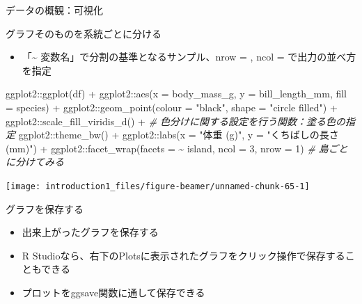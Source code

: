 \documentclass[
  ignorenonframetext,
]{beamer}
\newenvironment{Shaded}{\begin{snugshade}}{\end{snugshade}}
\newcommand{\AttributeTok}[1]{\textcolor[rgb]{0.77,0.63,0.00}{#1}}
\newcommand{\CommentTok}[1]{\textcolor[rgb]{0.56,0.35,0.01}{\textit{#1}}}
\newcommand{\DecValTok}[1]{\textcolor[rgb]{0.00,0.00,0.81}{#1}}
\newcommand{\FunctionTok}[1]{\textcolor[rgb]{0.00,0.00,0.00}{#1}}
\newcommand{\NormalTok}[1]{#1}
\newcommand{\SpecialCharTok}[1]{\textcolor[rgb]{0.00,0.00,0.00}{#1}}
\newcommand{\StringTok}[1]{\textcolor[rgb]{0.31,0.60,0.02}{#1}}
\providecommand{\tightlist}{%
  \setlength{\itemsep}{0pt}\setlength{\parskip}{0pt}}
\begin{document}
\begin{frame}[fragile]{データの概観：可視化}
\begin{block}{グラフそのものを系統ごとに分ける}
\begin{itemize}
  \begin{itemize}
  \tightlist
  \item
    「\textasciitilde{} 変数名」で分割の基準となるサンプル、nrow = ,
    ncol = で出力の並べ方を指定
  \end{itemize}
\end{itemize}

\begin{Shaded}
\begin{Highlighting}[]
\NormalTok{ggplot2}\SpecialCharTok{::}\FunctionTok{ggplot}\NormalTok{(df) }\SpecialCharTok{+}
\NormalTok{  ggplot2}\SpecialCharTok{::}\FunctionTok{aes}\NormalTok{(}\AttributeTok{x =}\NormalTok{ body\_mass\_g, }\AttributeTok{y =}\NormalTok{ bill\_length\_mm, }\AttributeTok{fill =}\NormalTok{ species) }\SpecialCharTok{+}
\NormalTok{  ggplot2}\SpecialCharTok{::}\FunctionTok{geom\_point}\NormalTok{(}\AttributeTok{colour =} \StringTok{"black"}\NormalTok{, }\AttributeTok{shape =} \StringTok{"circle filled"}\NormalTok{) }\SpecialCharTok{+}
\NormalTok{  ggplot2}\SpecialCharTok{::}\FunctionTok{scale\_fill\_viridis\_d}\NormalTok{() }\SpecialCharTok{+} \CommentTok{\# 色分けに関する設定を行う関数：塗る色の指定}
\NormalTok{  ggplot2}\SpecialCharTok{::}\FunctionTok{theme\_bw}\NormalTok{() }\SpecialCharTok{+}
\NormalTok{  ggplot2}\SpecialCharTok{::}\FunctionTok{labs}\NormalTok{(}\AttributeTok{x =} \StringTok{"体重 (g)"}\NormalTok{, }\AttributeTok{y =} \StringTok{"くちばしの長さ (mm)"}\NormalTok{) }\SpecialCharTok{+}
\NormalTok{  ggplot2}\SpecialCharTok{::}\FunctionTok{facet\_wrap}\NormalTok{(}\AttributeTok{facets =} \SpecialCharTok{\textasciitilde{}}\NormalTok{ island, }\AttributeTok{ncol =} \DecValTok{3}\NormalTok{, }\AttributeTok{nrow =} \DecValTok{1}\NormalTok{) }\CommentTok{\# 島ごとに分けてみる}
\end{Highlighting}
\end{Shaded}

\begin{center}\texttt{[image: introduction1\_files/figure-beamer/unnamed-chunk-65-1]} \end{center}
\end{block}

\begin{block}{グラフを保存する}
\protect\hypertarget{ux30b0ux30e9ux30d5ux3092ux4fddux5b58ux3059ux308b}{}
\begin{itemize}
\tightlist
\item
  出来上がったグラフを保存する
\item
  R
  Studioなら、右下のPlotsに表示されたグラフをクリック操作で保存することもできる
\item
  プロットをggsave関数に通して保存できる
\end{itemize}


\end{block}
\end{frame}
\end{document}
